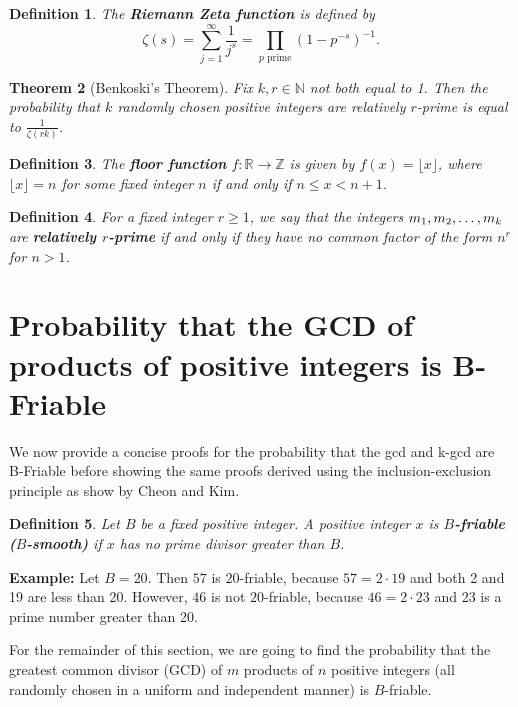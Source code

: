 \documentclass[12pt]{amsart}
\newtheorem{theorem}{Theorem}[subsection]
\newtheorem{definition}[theorem]{Definition}
\theoremstyle{definition}
\begin{document}
\begin{definition} \label{riemann-zeta}
	The \textbf{Riemann Zeta function} is defined by 
	$$\zeta(s)=\sum_{j=1}^{\infty} \frac{1}{j^s}=\prod_{p \textrm{ prime}}(1-p^{-s})^{-1}.$$
\end{definition}	

\begin{theorem}[Benkoski's Theorem]
Fix $k,r\in \mathbb{N}$ not both equal to 1. Then the probability that $k$ randomly chosen positive integers are relatively $r$-prime is equal to $\displaystyle \frac{1}{\zeta(rk)}$.
\end{theorem}


\begin{definition} The \textbf{floor function} $f: \mathbb{R} \to \mathbb{Z}$ is given by $f(x) = \lfloor x \rfloor$, where $\lfloor x \rfloor = n$ for some fixed integer $n$ if and only if $n\leq x < n+1$.
\end{definition}

\begin{definition} For a fixed integer \(r\geq 1\), we say that the integers \(m_1,m_2,\mathellipsis,m_k\) are \textbf{relatively \(r\)-prime} if and only if they have no common factor of the form \(n^r\) for \(n>1\). 
\end{definition}

 \section{Probability that the GCD of products of positive integers is  B-Friable}
We now provide a concise proofs for the probability that the gcd and k-gcd are B-Friable before showing the same proofs derived using the inclusion-exclusion principle as show by Cheon and Kim.

\begin{definition} Let $B$ be a fixed positive integer. A positive integer $x$ is \textbf{$B$-friable ($B$-smooth)} if $x$ has no prime divisor greater than $B$. 
\end{definition}

\noindent \textbf{Example:} Let $B = 20$. Then $57$ is $20$-friable, because $57 = 2 \cdot 19$ and both 2 and 19 are less than 20. However, $46$ is not $20$-friable, because $46= 2 \cdot 23$ and 23 is a prime number greater than 20.

\vspace{.1 in}

For the remainder of this section, we are going to find the probability that the greatest common divisor (GCD) of $m$ products of $n$ positive integers (all randomly chosen in a uniform and independent manner) is $B$-friable.
\end{document}
